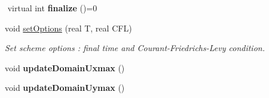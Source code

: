 \begin{DoxyCompactItemize}
$$\mbox{\label{classEngine_a1b3dc669e0b686b4d2f32d57f980b7bd}} 
virtual int {\bfseries finalize} ()=0
\item 
void \mbox{\hyperlink{classEngine_a6837cf148e122390a924718435cea117}{set\+Options}} (real T, real C\+FL)
\begin{DoxyCompactList}\small\item\em Set scheme options \+: final time and Courant-\/\+Friedrichs-\/\+Levy condition. \end{DoxyCompactList}\item 
\mbox{\label{classEngine_afca31326a5716439b2d0303cc9888cc5}} 
void {\bfseries update\+Domain\+Uxmax} ()
\item 
\mbox{\label{classEngine_ab6dee2316ca22ea528cd49fdb397f25c}} 
void {\bfseries update\+Domain\+Uymax} ()
\end{DoxyCompactItemize}
